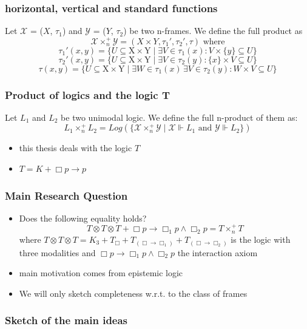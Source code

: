\documentclass[hyperref={pdfpagelabels=false},t,10pt]{beamer}
\begin{document}
\begin{frame}
  \frametitle{horizontal, vertical and standard functions}
  Let $\mathcal{X}$ = ($X$, $\tau_1$) and $\mathcal{Y}$ = ($Y$, $\tau_2$) be two n-frames. We define the full product as
    $$\mathcal{X} \times_n^+  \mathcal{Y} = (X \times Y, \tau_1', \tau_2', \tau) \text{ where}$$
    $$ \tau_1'(x,y) = \{ U \subseteq \mbox{X} \times \mbox{Y} \mid \exists V \in \tau_1(x) : V \times  \{ y \} \subseteq U \}$$
    $$ \tau_2'(x,y) = \{ U \subseteq \mbox{X} \times \mbox{Y} \mid \exists V \in \tau_2(y) : \{ x \} \times V \subseteq U \}$$
        $$ \tau(x,y) = \{ U \subseteq \mbox{X} \times \mbox{Y} \mid \exists W \in \tau_1(x) \, \exists V \in \tau_2(y) : W \times V \subseteq U \}$$   
\end{frame}

\begin{frame}
  \frametitle{Product of logics and the logic T}
  Let $L_1$ and $L_2$ be two unimodal logic. We define the full n-product of them as:
  $$L_1 \times_n^+ L_2 =  Log(\{\mathcal{X} \times_n^+ \mathcal{Y} \mid \mathcal{X} \Vdash L_1 \text{ and } \mathcal{Y} \Vdash L_2 \})$$ \pause
  \begin{itemize}
    \item this thesis deals with the logic $T$
    \item $T = K + \Box p \rightarrow p$
  \end{itemize}
\end{frame}

\begin{frame}
  \frametitle{Main Research Question}
  \begin{itemize}
    \item Does the following equality holds? 
    $$T \otimes T \otimes T + \Box p \rightarrow \Box_1 p \land \Box_2 p = T \times_n^+ T$$
    where $T \otimes T \otimes T = K_3 + T_{\Box} + T_{(\Box \rightarrow \Box_1)} + T_{(\Box \rightarrow \Box_2)}$ is the logic with three modalities 
    and $\Box p \rightarrow \Box_1 p \land \Box_2 p$ the interaction axiom
    \item main motivation comes from epistemic logic 
    \item We will only sketch completeness w.r.t. to the class of frames
  \end{itemize}
\end{frame}

\begin{frame}
  \frametitle{Sketch of the main ideas}
  

\end{frame}
\end{document}
